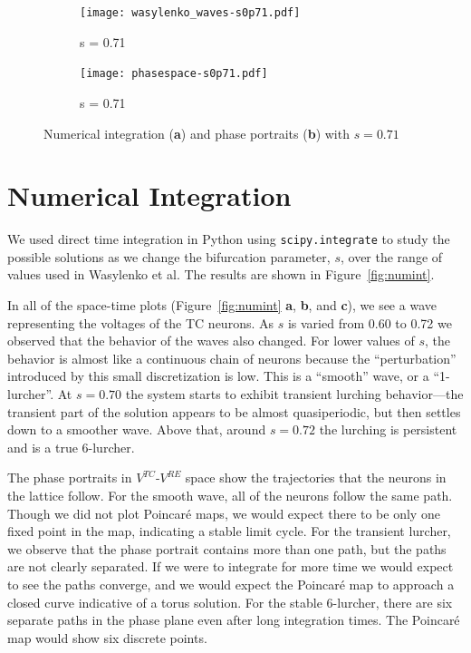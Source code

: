 \documentclass[12pt,letterpaper,oneside,openany]{article}
\begin{document}
\begin{figure}[t]
        \begin{subfigure}[b]{0.5\textwidth}
                \centering
                \texttt{[image: wasylenko\_waves-s0p71.pdf]}
                \caption{s = 0.71}
                \label{fig:waves71}
        \end{subfigure}
        \begin{subfigure}[b]{0.4\textwidth}
                \centering
                \texttt{[image: phasespace-s0p71.pdf]}
                \caption{s = 0.71}
                \label{fig:phase71}
        \end{subfigure}
  \caption{Numerical integration ({\bf a}) and phase portraits ({\bf b}) with $s = 0.71$}
  \label{fig:quasiper}
\end{figure}

\section{Numerical Integration}


We used direct time integration in Python using \texttt{scipy.integrate} to study the possible solutions as we change the bifurcation parameter, $s$, over the range of values used in Wasylenko et al.\cite{Wasylenko2010} The results are shown in Figure~\ref{fig:numint}.

In all of the space-time plots (Figure~\ref{fig:numint} {\bf a}, {\bf b}, and {\bf c}), we see a wave representing the voltages of the TC neurons. As $s$ is varied from 0.60 to 0.72 we observed that the behavior of the waves also changed. For lower values of $s$, the behavior is almost like a continuous chain of neurons because the ``perturbation'' introduced by this small discretization is low. This is a ``smooth'' wave, or a ``1-lurcher''. At $s=0.70$ the system starts to exhibit transient lurching behavior---the transient part of the solution appears to be almost quasiperiodic, but then settles down to a smoother wave. Above that, around $s=0.72$ the lurching is persistent and is a true 6-lurcher.

The phase portraits in $V^{TC}$-$V^{RE}$ space show the trajectories that the neurons in the lattice follow. For the smooth wave, all of the neurons follow the same path. Though we did not plot Poincar\'{e} maps, we would expect there to be only one fixed point in the map, indicating a stable limit cycle. For the transient lurcher, we observe that the phase portrait contains more than one path, but the paths are not clearly separated. If we were to integrate for more time we would expect to see the paths converge, and we would expect the Poincar\'{e} map to approach a closed curve indicative of a torus solution. For the stable 6-lurcher, there are six separate paths in the phase plane even after long integration times. The Poincar\'{e} map would show six discrete points.
\end{document}
